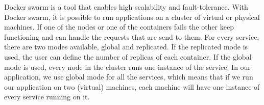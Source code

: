 Docker swarm is a tool that enables high scalability and fault-tolerance. With Docker swarm, it is possible to run applications on a cluster of virtual or physical machines. If one of the nodes or one of the containers fails the other keep functioning and can handle the requests that are send to them. For every service, there are two modes available, global and replicated. If  the replicated mode is used, the user can define the number of replicas of each container. If the global mode is used, every node in the cluster runs one instance of the service. In our application, we use global mode for all the services, which means that if we run our application on two (virtual) machines, each machine will have one instance of every service running on it.

